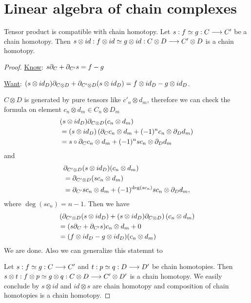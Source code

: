 \documentclass[11pt]{book} %
\begin{document}
\section{Linear algebra of chain complexes}
\begin{exr}
Tensor product is compatible with chain homotopy. Let $s:  f \simeq g: C\longrightarrow C'$  be a chain homotopy. Then $s\otimes id :f\otimes id  \simeq g \otimes id : C\otimes D \longrightarrow C' \otimes D$ is a chain homotopy.
\end{exr}
\begin{proof}
\underline{Know}: $ s{\partial}_{C}+{\partial}_{C'} s=f-g$

\underline{Want}: $(s\otimes id_D){\partial}_{C\otimes D} +{\partial}_{C'\otimes D} (s\otimes id_D)=f\otimes id_D-g\otimes id_D$. 

$C\otimes D$ is generated by pure tensors like $c'_n\otimes d_m$, therefore we can  check the formula on element $c_n\otimes d_m\in C_n\otimes D_m$
$$
\begin{aligned}
&(s\otimes id_D){\partial}_{C\otimes D}(c_n\otimes d_m)\\
&=(s\otimes id_D)\left({\partial}_C c_n\otimes d_m +(-1)^n c_n\otimes{\partial}_D d_m\right)\\
&=s\circ {\partial}_C c_n\otimes d_m+(-1)^n s c_n\otimes {\partial}_D d_m
\end{aligned}
$$
and
$$
\begin{aligned}
&{\partial}_{C'\otimes D} (s\otimes id_D)(c_n\otimes d_m)\\
&={\partial}_{C'\otimes D} (s c_n\otimes d_m)\\
&= {\partial}_{C'} s c_n \otimes d_m+(-1)^{\deg(sc_n)}sc_n\otimes {\partial}_D d_m,
\end{aligned}
$$
where $\deg (sc_n)=n-1$. Then we have
$$
\begin{aligned}
&\left({\partial}_{C'\otimes D} (s\otimes id_D)+(s\otimes id_D){\partial}_{C\otimes D}\right) (c_n\otimes d_m)\\
&=(s{\partial}_C+{\partial}_{C'} s)c_n \otimes d_m+0\\
&=(f\otimes id_D-g\otimes id_D)(c_n\otimes d_m)
\end{aligned}
$$
We are done. Also we can generalize this statemnt to 

 Let $s:  f \simeq g: C\longrightarrow C'$ and  $t:  p \simeq q: D\longrightarrow D'$ be chain homotopies. Then $s\otimes t :f\otimes p  \simeq g \otimes q : C\otimes D \longrightarrow C' \otimes D'$ is a chain homotopy. We easily conclude by $s\otimes id$ and $id\otimes s$ are chain homotopy and composition of chain homotopies is a chain homotopy.
\end{proof}
\end{document}
